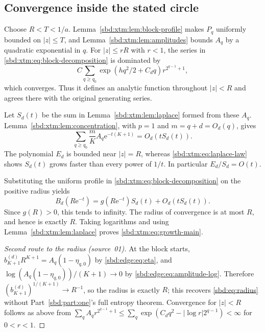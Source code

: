 \documentclass[11pt,a4paper]{article}
\theoremstyle{definition}
\newcommand{\e}{\mathrm e}
\begin{document}
\subsection{Convergence inside the stated circle}
Choose $R<T<1/a$. Lemma~\ref{sbd:xtm:lem:block-profile} makes $P_q$
uniformly bounded on $|z|\le T$, and Lemma~\ref{sbd:xtm:lem:amplitudes}
bounds $A_q$ by a quadratic exponential in $q$. For $|z|\le rR$ with $r<1$,
the series in \eqref{sbd:xtm:eq:block-decomposition} is dominated by
\[
 C\sum_{q\ge q_0}\exp(hq^2/2+C_dq)r^{2^{q-1}+1},
\]
which converges. Thus it defines an analytic function throughout $|z|<R$
and agrees there with the original generating series.

Let $S_d(t)$ be the sum in Lemma~\ref{sbd:xtm:lem:laplace} formed from these
$A_q$. Lemma~\ref{sbd:xtm:lem:concentration}, with $p=1$ and $m=q+d=O_d(q)$,
gives
\begin{equation}\label{sbd:xtm:eq:sum-error}
 \sum_{q\ge q_0}\frac mK A_q\e^{-t(K+1)}
   =O_d(tS_d(t)).
\end{equation}
The polynomial $E_d$ is bounded near $|z|=R$, whereas
\eqref{sbd:xtm:eq:laplace-law} shows $S_d(t)$ grows faster than every power
of $1/t$. In particular $E_d/S_d=O(t)$.

Substituting the uniform profile in \eqref{sbd:xtm:eq:block-decomposition}
on the positive radius yields
\begin{equation}\label{sbd:xtm:eq:positive-transfer}
 B_d(R\e^{-t})=g(R\e^{-t})S_d(t)+O_d(tS_d(t)).
\end{equation}
Since $g(R)>0$, this tends to infinity. The radius of convergence is at
most $R$, and hence is exactly $R$. Taking logarithms and using
Lemma~\ref{sbd:xtm:lem:laplace} proves \eqref{sbd:xtm:eq:growth-main}.

\begin{proof}[Second route to the radius (source~01)]
At the block starts, $b_{K+1}^{(d)}R^{K+1}=A_q(1-\eta_{q,0})$ by
\eqref{sbd:edge:eq:eta}, and $\log(A_q(1-\eta_{q,0}))/(K+1)\to0$ by
\eqref{sbd:edge:eq:amplitude-log}. Therefore
$(b_{K+1}^{(d)})^{1/(K+1)}\to R^{-1}$, so the radius is exactly $R$; this
recovers \eqref{sbd:eq:radius} without Part~\ref{sbd:part:one}'s full
entropy theorem. Convergence for $|z|<R$ follows as above from
$\sum_qA_qr^{2^{q-1}+1}\le\sum_q\exp(C_dq^2-|\log r|2^{q-1})<\infty$ for
$0<r<1$.
\end{proof}
\end{document}
